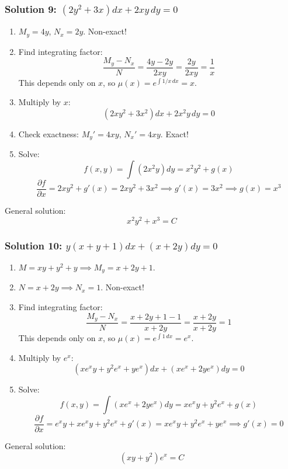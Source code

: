 \documentclass[11pt,letterpaper]{article}
\begin{document}
\subsubsection*{Solution 9: $(2y^2 + 3x)dx + 2xy\,dy = 0$}
\begin{enumerate}
    \item $M_y = 4y$, $N_x = 2y$. Non-exact!
    \item Find integrating factor:
    \[ \frac{M_y - N_x}{N} = \frac{4y - 2y}{2xy} = \frac{2y}{2xy} = \frac{1}{x} \]
    This depends only on $x$, so $\mu(x) = e^{\int 1/x \, dx} = x$.
    \item Multiply by $x$:
    \[ (2xy^2 + 3x^2)dx + 2x^2y\,dy = 0 \]
    \item Check exactness: $M_y' = 4xy$, $N_x' = 4xy$. Exact!
    \item Solve:
    \[ f(x,y) = \int (2x^2y) dy = x^2 y^2 + g(x) \]
    \[ \frac{\partial f}{\partial x} = 2xy^2 + g'(x) = 2xy^2 + 3x^2 \implies g'(x) = 3x^2 \implies g(x) = x^3 \]
\end{enumerate}
General solution:
\[ x^2 y^2 + x^3 = C \]

\subsubsection*{Solution 10: $y(x + y + 1)dx + (x + 2y)dy = 0$}
\begin{enumerate}
    \item $M = xy + y^2 + y \implies M_y = x + 2y + 1$.
    \item $N = x + 2y \implies N_x = 1$. Non-exact!
    \item Find integrating factor:
    \[ \frac{M_y - N_x}{N} = \frac{x + 2y + 1 - 1}{x + 2y} = \frac{x+2y}{x+2y} = 1 \]
    This depends only on $x$, so $\mu(x) = e^{\int 1 \, dx} = e^x$.
    \item Multiply by $e^x$:
    \[ (x e^x y + y^2 e^x + y e^x)dx + (x e^x + 2y e^x)dy = 0 \]
    \item Solve:
    \[ f(x,y) = \int (x e^x + 2y e^x) dy = x e^x y + y^2 e^x + g(x) \]
    \[ \frac{\partial f}{\partial x} = e^x y + x e^x y + y^2 e^x + g'(x) = x e^x y + y^2 e^x + y e^x \implies g'(x) = 0 \]
\end{enumerate}
General solution:
\[ (xy + y^2)e^x = C \]
\end{document}
